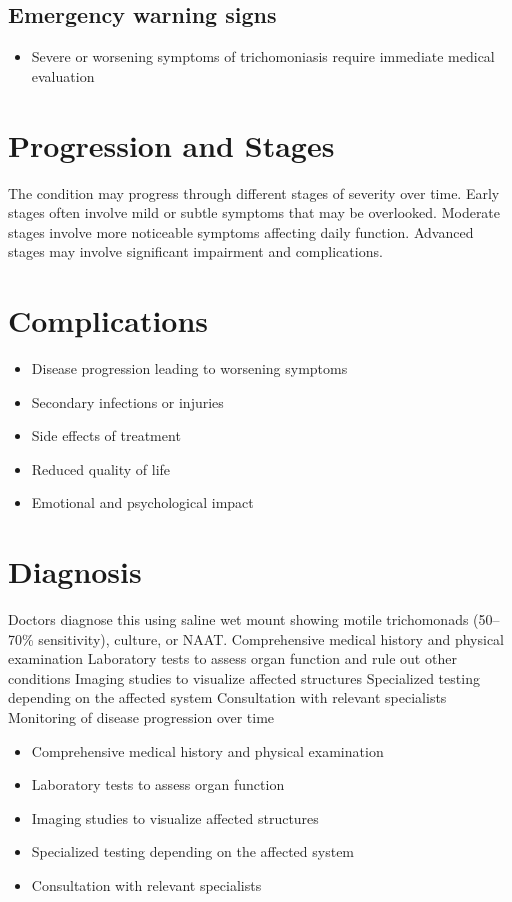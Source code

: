 \subsection{Emergency warning signs}
\begin{itemize}[noitemsep]
  \item Severe or worsening symptoms of trichomoniasis require immediate medical evaluation
\end{itemize}
\section{Progression and Stages}
The condition may progress through different stages of severity over time. Early stages often involve mild or subtle symptoms that may be overlooked. Moderate stages involve more noticeable symptoms affecting daily function. Advanced stages may involve significant impairment and complications.
\section{Complications}
\begin{itemize}[noitemsep]
  \item Disease progression leading to worsening symptoms
  \item Secondary infections or injuries
  \item Side effects of treatment
  \item Reduced quality of life
  \item Emotional and psychological impact
\end{itemize}
\section{Diagnosis}
Doctors diagnose this using saline wet mount showing motile trichomonads (50--70\% sensitivity), culture, or NAAT. Comprehensive medical history and physical examination Laboratory tests to assess organ function and rule out other conditions Imaging studies to visualize affected structures Specialized testing depending on the affected system Consultation with relevant specialists Monitoring of disease progression over time

\begin{itemize}[noitemsep]
  \item Comprehensive medical history and physical examination
  \item Laboratory tests to assess organ function
  \item Imaging studies to visualize affected structures
  \item Specialized testing depending on the affected system
  \item Consultation with relevant specialists
\end{itemize}
